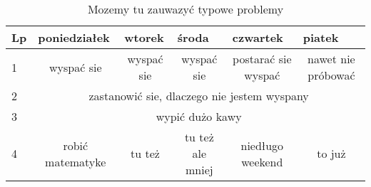 \begin{table}[htbp]
\begin{tabular}{|l|ccccc|}
\hline
Lp &
  \multicolumn{1}{l|}{poniedziałek} &
  \multicolumn{1}{l|}{wtorek} &
  \multicolumn{1}{l|}{środa} &
  \multicolumn{1}{l|}{czwartek} &
  \multicolumn{1}{l|}{piatek} \\ \hline
1 & \multicolumn{1}{c|}{wyspać sie} & \multicolumn{1}{c|}{wyspać sie} & \multicolumn{1}{c|}{wyspać sie} & \multicolumn{1}{c|}{postarać sie wyspać} & nawet nie próbować \\ \hline
2 &
  \multicolumn{5}{c|}{zastanowić sie, dlaczego nie jestem wyspany} \\ \hline
3 &
  \multicolumn{5}{c|}{wypić dużo kawy} \\ \hline
4 &
  \multicolumn{1}{c|}{robić matematyke} &
  \multicolumn{1}{c|}{tu też} &
  \multicolumn{1}{c|}{tu też ale mniej} &
  \multicolumn{1}{c|}{niedługo weekend} &
  to już \\ \hline
\end{tabular}
\label{tab:tabela_bg}
\caption{Mozemy tu zauwazyć typowe problemy}
\end{table}